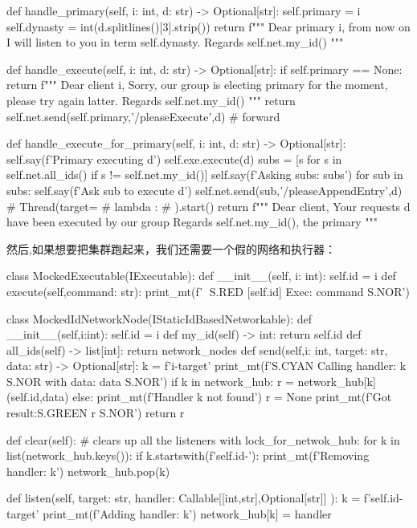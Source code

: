 \documentclass[dvipsnames]{ctexart}
\begin{document}
\begin{simplepy}
    def handle_primary(self, i: int, d: str) -> Optional[str]:
        self.primary = i
        self.dynasty = int(d.splitlines()[3].strip())
        return f"""
        Dear primary {i},
             from now on I will listen to you in term {self.dynasty}.
                      Regards {self.net.my_id()}
        """

    def handle_execute(self, i: int, d: str) -> Optional[str]:
        if self.primary == None:
            return f"""
            Dear client {i},
                Sorry, our group is electing primary for the moment,
                please try again latter.
                    Regards {self.net.my_id()}
            """
        return self.net.send(self.primary,'/pleaseExecute',d)  # forward

    def handle_execute_for_primary(self, i: int, d: str) -> Optional[str]:
        self.say(f'Primary executing {d}')
        self.exe.execute(d)
        subs = [s for s in self.net.all_ids() if s != self.net.my_id()]
        self.say(f'Asking subs: {subs}')
        for sub in subs:
            self.say(f'Ask {sub} to execute {d}')
            self.net.send(sub,'/pleaseAppendEntry',d)
            # Thread(target=
            #        lambda : 
            #        ).start()
        return f"""
        Dear client,
             Your requests {d} have been executed by our group
                  Regards {self.net.my_id()}, the primary
        """
\end{simplepy}
然后,如果想要把集群跑起来，我们还需要一个假的网络和执行器：
\begin{simplepy}
class MockedExecutable(IExecutable):
    def __init__(self, i: int):
        self.id = i
    def execute(self,command: str):
        print_mt(f'🦜 {S.RED} [{self.id}] Exec: {command} {S.NOR}')


class MockedIdNetworkNode(IStaticIdBasedNetworkable):
    def __init__(self,i:int):
        self.id = i
    def my_id(self) -> int:
        return self.id
    def all_ids(self) -> list[int]:
        return network_nodes
    def send(self,i: int, target: str, data: str) -> Optional[str]:
        k = f'{i}-{target}'
        print_mt(f'{S.CYAN} Calling handler: {k} {S.NOR} with data: {data} {S.NOR}')
        if k in network_hub:
            r = network_hub[k](self.id,data)
        else:
            print_mt(f'Handler {k} not found')
            r = None
        print_mt(f'Got result:{S.GREEN} {r} {S.NOR}')
        return r

    def clear(self):                # clears up all the listeners
        with lock_for_netwok_hub:
            for k in list(network_hub.keys()):
                if k.startswith(f'{self.id}-'):
                    print_mt(f'Removing handler: {k}')
                    network_hub.pop(k)

    def listen(self,
               target: str,
               handler: Callable[[int,str],Optional[str]]
               ):
        k = f'{self.id}-{target}'
        print_mt(f'Adding handler: {k}')
        network_hub[k] = handler

\end{simplepy}
\end{document}
